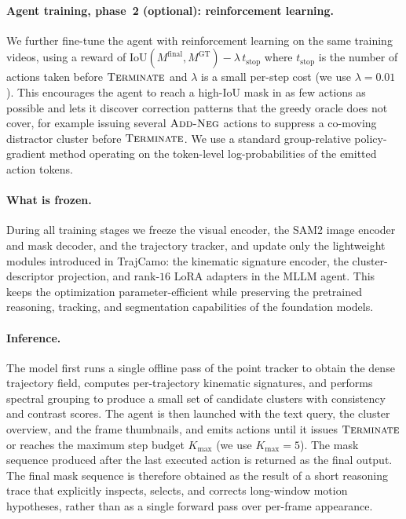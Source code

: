 \documentclass[11pt]{article}
\begin{document}
\paragraph{Agent training, phase~2 (optional): reinforcement learning.}
We further fine-tune the agent with reinforcement learning on the same training videos, using a reward of $\mathrm{IoU}(M^{\mathrm{final}}, M^{\mathrm{GT}})-\lambda\,t_{\mathrm{stop}}$ where $t_{\mathrm{stop}}$ is the number of actions taken before $\textsc{Terminate}$ and $\lambda$ is a small per-step cost (we use $\lambda=0.01$).
This encourages the agent to reach a high-IoU mask in as few actions as possible and lets it discover correction patterns that the greedy oracle does not cover, for example issuing several $\textsc{Add-Neg}$ actions to suppress a co-moving distractor cluster before $\textsc{Terminate}$.
We use a standard group-relative policy-gradient method operating on the token-level log-probabilities of the emitted action tokens.

\paragraph{What is frozen.}
During all training stages we freeze the visual encoder, the SAM2 image encoder and mask decoder, and the trajectory tracker, and update only the lightweight modules introduced in TrajCamo: the kinematic signature encoder, the cluster-descriptor projection, and rank-$16$ LoRA adapters in the MLLM agent.
This keeps the optimization parameter-efficient while preserving the pretrained reasoning, tracking, and segmentation capabilities of the foundation models.

\paragraph{Inference.}
The model first runs a single offline pass of the point tracker to obtain the dense trajectory field, computes per-trajectory kinematic signatures, and performs spectral grouping to produce a small set of candidate clusters with consistency and contrast scores.
The agent is then launched with the text query, the cluster overview, and the frame thumbnails, and emits actions until it issues $\textsc{Terminate}$ or reaches the maximum step budget $K_{\max}$ (we use $K_{\max}=5$).
The mask sequence produced after the last executed action is returned as the final output.
The final mask sequence is therefore obtained as the result of a short reasoning trace that explicitly inspects, selects, and corrects long-window motion hypotheses, rather than as a single forward pass over per-frame appearance.
\end{document}
